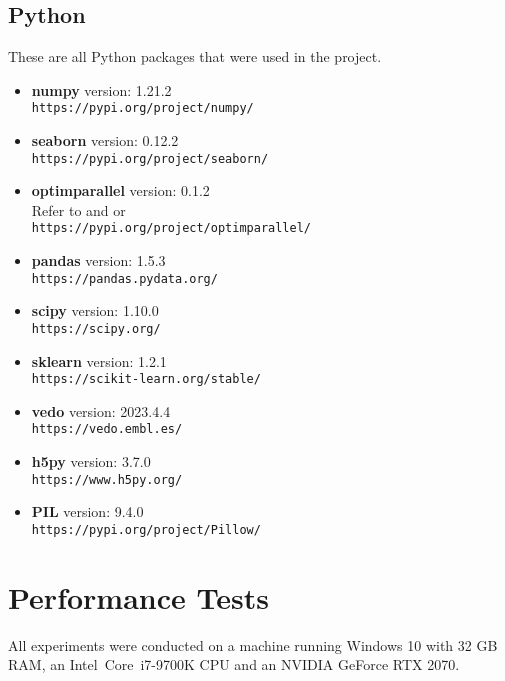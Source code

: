 \subsection{Python}
These are all Python packages that were used in the project.
\begin{itemize}
    \item \textbf{numpy} version: 1.21.2 \\\texttt{https://pypi.org/project/numpy/}
    \item \textbf{seaborn} version: 0.12.2 \\\texttt{https://pypi.org/project/seaborn/}
    \item \textbf{optimparallel} version: 0.1.2 \\Refer to \cite{florian_gerber_2020_3888570} and \cite{RJ-2019-030} or \\\texttt{https://pypi.org/project/optimparallel/}
    \item \textbf{pandas} version: 1.5.3 \\\texttt{https://pandas.pydata.org/}
    \item \textbf{scipy} version: 1.10.0 \\\texttt{https://scipy.org/}
    \item \textbf{sklearn} version: 1.2.1 \\\texttt{https://scikit-learn.org/stable/}
    \item \textbf{vedo} version: 2023.4.4 \\\texttt{https://vedo.embl.es/}
    \item \textbf{h5py} version: 3.7.0 \\\texttt{https://www.h5py.org/}
    \item \textbf{PIL} version: 9.4.0 \\\texttt{https://pypi.org/project/Pillow/}
\end{itemize}

\section{Performance Tests}
All experiments were conducted on a machine running Windows 10 with 32 GB RAM, an Intel\textregistered\ Core\texttrademark\ i7-9700K CPU and an NVIDIA GeForce RTX 2070.